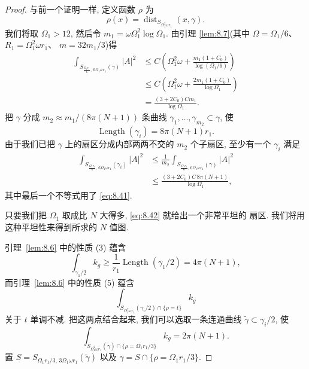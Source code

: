 \begin{proof}
与前一个证明一样, 定义函数 $\rho$ 为
\[
\rho(x)=\operatorname{dist}_{S_{\Omega_1^2\omega r_1}}(x,\gamma).
\]
我们将取 $\Omega_1>12$, 然后令 $m_1=\omega\Omega_1^2\log\Omega_1$. 由引理
\ref{lem:8.7}(其中 $\Omega=\Omega_1/6$、$R_1=\Omega_1^2\omega r_1$、
$m=32m_1/3$)得
\begin{equation}
\begin{aligned}
\int_{S_{\frac{\Omega_1r_1}{6},\,6\Omega_1\omega r_1}(\gamma)}|A|^2
&\leq C\left(\Omega_1^2\omega+\frac{m_1(1+C_0)}{\log(\Omega_1/6)}\right)\\
&\leq C\left(\Omega_1^2\omega+\frac{2m_1(1+C_0)}{\log\Omega_1}\right)\\
&=\frac{(3+2C_0)Cm_1}{\log\Omega_1}.
\end{aligned}
\label{eq:8.41}
\end{equation}
把 $\gamma$ 分成 $m_2\approx m_1/(8\pi(N+1))$ 条曲线
$\gamma_1,\ldots,\gamma_{m_2}\subset\gamma$, 使
\[
\operatorname{Length}(\gamma_i)=8\pi(N+1)r_1.
\]
由于我们已把 $\gamma$ 上的扇区分成内部两两不交的 $m_2$ 个子扇区, 至少有一个
$\gamma_i$ 满足
\begin{equation}
\begin{aligned}
\int_{S_{\frac{\Omega_1r_1}{6},\,6\Omega_1\omega r_1}(\gamma_i)}|A|^2
&\leq\frac1{m_2}
  \int_{S_{\frac{\Omega_1r_1}{6},\,6\Omega_1\omega r_1}(\gamma)}|A|^2\\
&\leq\frac{(3+2C_0)C\,8\pi(N+1)}{\log\Omega_1},
\end{aligned}
\label{eq:8.42}
\end{equation}
其中最后一个不等式用了 \eqref{eq:8.41}.

只要我们把 $\Omega_1$ 取成比 $N$ 大得多, \eqref{eq:8.42} 就给出一个非常平坦的
扇区. 我们将用这种平坦性来得到所求的 $N$ 值图.

引理~\ref{lem:8.6} 中的性质 (3) 蕴含
\[
\int_{\gamma_1/2}k_g\geq\frac1{r_1}\operatorname{Length}(\gamma_1/2)
 =4\pi(N+1),
\]
而引理~\ref{lem:8.6} 中的性质 (5) 蕴含
\[
\int_{S_{\Omega_1^2\omega r_1}(\gamma_i/2)\cap\{\rho=t\}}k_g
\]
关于 $t$ 单调不减. 把这两点结合起来, 我们可以选取一条连通曲线
$\tilde\gamma\subset\gamma_i/2$, 使
\begin{equation}
\int_{S_{\Omega_1^2\omega r_1}(\tilde\gamma)\cap
  \{\rho=\Omega_1r_1/3\}}k_g=2\pi(N+1).
\label{eq:8.43}
\end{equation}
置 $S=S_{\Omega_1r_1/3,\,3\Omega_1\omega r_1}(\tilde\gamma)$ 以及
$\hat\gamma=S\cap\{\rho=\Omega_1r_1/3\}$.


\end{proof}
